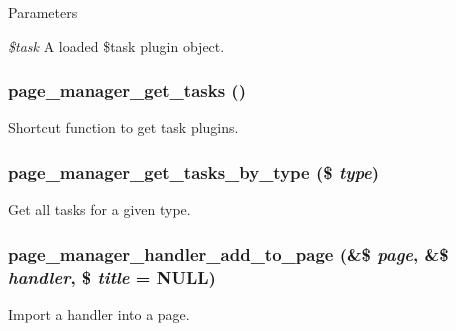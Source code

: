 \begin{DoxyParams}{Parameters}
\item[{\em \$task}]A loaded \$task plugin object. \end{DoxyParams}
\hypertarget{page__manager_8module_a11bb15144d50a80ca103073b361c2ec4}{
\subsubsection[{page\_\-manager\_\-get\_\-tasks}]{\setlength{\rightskip}{0pt plus 5cm}page\_\-manager\_\-get\_\-tasks ()}}
\label{page__manager_8module_a11bb15144d50a80ca103073b361c2ec4}
Shortcut function to get task plugins. \hypertarget{page__manager_8module_a6246786e5a4176c40200decc53458a77}{
\subsubsection[{page\_\-manager\_\-get\_\-tasks\_\-by\_\-type}]{\setlength{\rightskip}{0pt plus 5cm}page\_\-manager\_\-get\_\-tasks\_\-by\_\-type (\$ {\em type})}}
\label{page__manager_8module_a6246786e5a4176c40200decc53458a77}
Get all tasks for a given type. \hypertarget{page__manager_8module_abcdccf5848b9ac0922724ad19a56c8ae}{
\subsubsection[{page\_\-manager\_\-handler\_\-add\_\-to\_\-page}]{\setlength{\rightskip}{0pt plus 5cm}page\_\-manager\_\-handler\_\-add\_\-to\_\-page (\&\$ {\em page}, \/  \&\$ {\em handler}, \/  \$ {\em title} = {\ttfamily NULL})}}
\label{page__manager_8module_abcdccf5848b9ac0922724ad19a56c8ae}
Import a handler into a page.

